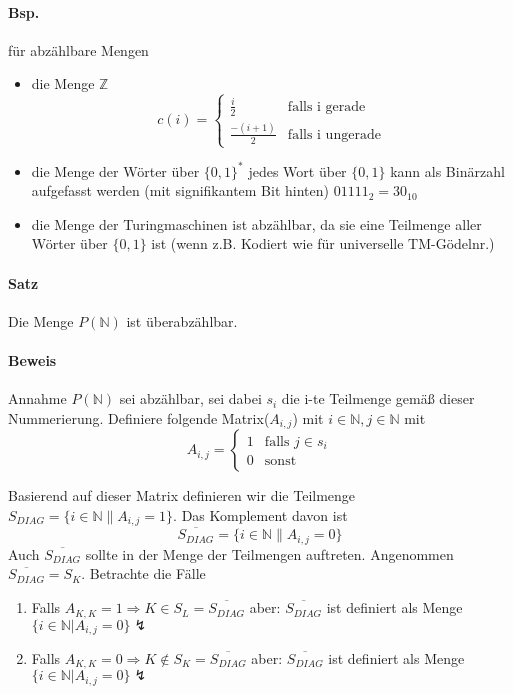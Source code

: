 \paragraph*{Bsp.} für abzählbare Mengen
\begin{itemize}
	\item die Menge $\mathbb{Z}$ $$ c(i)= \begin{cases}\frac{i}{2} & \text{falls i gerade}\\ \frac{-(i+1)}{2} & \text{falls i ungerade}\end{cases} $$ %
	\item die Menge der Wörter über $\{0,1\}^*$ jedes Wort über $\{0,1\}$ kann als Binärzahl aufgefasst werden (mit signifikantem Bit hinten) $01111_2=30_{10}$
	\item die Menge der Turingmaschinen ist abzählbar, da sie eine Teilmenge aller Wörter über $\{0,1\}$ ist (wenn z.B. Kodiert wie für universelle TM-Gödelnr.)
\end{itemize}

\paragraph*{Satz} Die Menge $P(\mathbb{N})$  ist überabzählbar.

\paragraph*{Beweis} Annahme $P(\mathbb{N})$ sei abzählbar, sei dabei $s_i$ die i-te Teilmenge gemäß dieser Nummerierung. Definiere folgende Matrix($A_{i,j}$) mit $i\in\mathbb{N},j\in\mathbb{N}$ mit $$ A_{i,j} = \begin{cases}1&\text{falls } j\in s_i \\ 0 & \text{sonst}\end{cases} $$ 

\par\medskip Basierend auf dieser Matrix definieren wir die Teilmenge $S_{DIAG}=\{ i\in\mathbb{N} \| A_{i,j}=1 \}$. Das Komplement davon ist $$ \overline{S_{DIAG}}=\{i\in\mathbb{N} \| A_{i,j}=0\} $$ Auch $\overline{S_{DIAG}}$ sollte in der Menge der Teilmengen auftreten. Angenommen $\overline{S_{DIAG}} = S_K$. Betrachte die Fälle \par\medskip
\begin{enumerate}
	\item Falls $A_{K,K}=1 \Rightarrow K \in S_L = \overline{S_{DIAG}}$ aber: $\overline{S_{DIAG}}$ ist definiert als Menge $\{i\in\mathbb{N}|A_{i,j}=0\} \lightning$ 
	\item Falls $A_{K,K}=0 \Rightarrow K \not\in S_K = \overline{S_{DIAG}}$ aber: $\overline{S_{DIAG}}$ ist definiert als Menge $\{i\in\mathbb{N}|A_{i,j}=0\} \lightning$
\end{enumerate}

